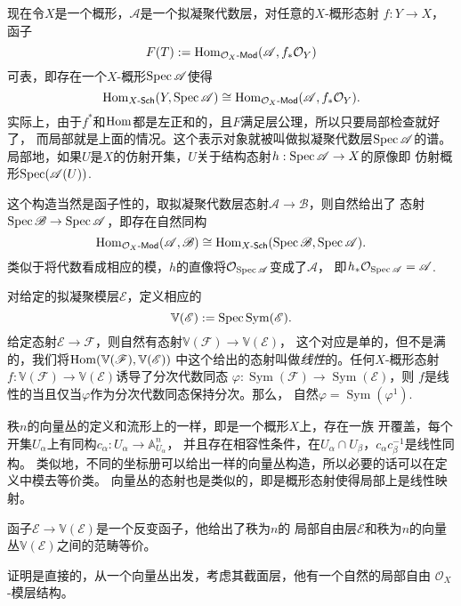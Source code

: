 现在令$X$是一个概形，$\mathscr A$是一个拟凝聚代数层，对任意的$X$-概形态射
$f:Y\to X$，函子
\[
    F(T):=\operatorname{Hom}_{\mathcal{O}_X\text{-}\mathsf{Mod}}(\mathscr A,f_*\mathcal{O}_Y)
\]
可表，即存在一个$X$-概形$\operatorname{Spec} \mathscr A$使得
\[
    \operatorname{Hom}_{X\text{-}\mathsf{Sch}}(Y,\operatorname{Spec} \mathscr A)\cong
    \operatorname{Hom}_{\mathcal{O}_X\text{-}\mathsf{Mod}}(\mathscr A,f_*\mathcal{O}_Y).
\]
实际上，由于$f^*$和$\operatorname{Hom}$都是左正和的，且$F$满足层公理，所以只要局部检查就好了，
而局部就是上面的情况。这个表示对象就被叫做拟凝聚代数层$\operatorname{Spec} \mathscr A$的谱。
局部地，如果$U$是$X$的仿射开集，$U$关于结构态射$h:\operatorname{Spec}\mathscr A\to X$的原像即
仿射概形$\operatorname{Spec}(\mathscr A(U))$. 

这个构造当然是函子性的，取拟凝聚代数层态射$\mathscr A\to \mathscr B$，则自然给出了
态射$\operatorname{Spec} \mathscr B\to \operatorname{Spec} \mathscr A$，即存在自然同构
\[
    \operatorname{Hom}_{\mathcal{O}_X\text{-}\mathsf{Mod}}(\mathscr A,\mathscr B)\cong
    \operatorname{Hom}_{X\text{-}\mathsf{Sch}}(\operatorname{Spec} \mathscr B,\operatorname{Spec} \mathscr A).
\]
类似于将代数看成相应的模，$h$的直像将$\mathcal O_{\operatorname{Spec} \mathscr A}$变成了$\mathscr A$，
即$h_*\mathcal O_{\operatorname{Spec} \mathscr A}=\mathscr A$.

\para 对给定的拟凝聚模层$\mathscr E$，定义相应的
\[
    \mathbb V(\mathscr E):=\operatorname{Spec} \operatorname{Sym}(\mathscr E).
\]
给定态射$\mathscr E\to \mathscr F$，则自然有态射$\mathbb V(\mathscr F)\to \mathbb V(\mathscr E)$，
这个对应是单的，但不是满的，我们将$\operatorname{Hom}(\mathbb V(\mathscr F),\mathbb V(\mathscr E))$
中这个给出的态射叫做\textit{线性}的。任何$X$-概形态射
$f:\mathbb V(\mathscr F)\to \mathbb V(\mathscr E)$诱导了分次代数同态
$\varphi:\operatorname{Sym}(\mathscr F)\to \operatorname{Sym}(\mathscr E)$，则
$f$是线性的当且仅当$\varphi$作为分次代数同态保持分次。那么，
自然$\varphi=\operatorname{Sym}(\varphi^1)$.

\para[向量丛] 秩$n$的向量丛的定义和流形上的一样，即是一个概形$X$上，存在一族
开覆盖，每个开集$U_\alpha$上有同构$c_\alpha:U_\alpha\to \mathbb A_{U_\alpha}^n$，
并且存在相容性条件，在$U_\alpha\cap U_\beta$，$c_\alpha c_\beta^{-1}$是线性同构。
类似地，不同的坐标册可以给出一样的向量丛构造，所以必要的话可以在定义中模去等价类。
向量丛的态射也是类似的，即是概形态射使得局部上是线性映射。


\begin{pro}
函子$\mathscr E\to \mathbb V(\mathscr E)$是一个反变函子，他给出了秩为$n$的
局部自由层$\mathscr E$和秩为$n$的向量丛$\mathbb V(\mathscr E)$之间的范畴等价。
\end{pro}

证明是直接的，从一个向量丛出发，考虑其截面层，他有一个自然的局部自由
$\mathscr O_X$-模层结构。


